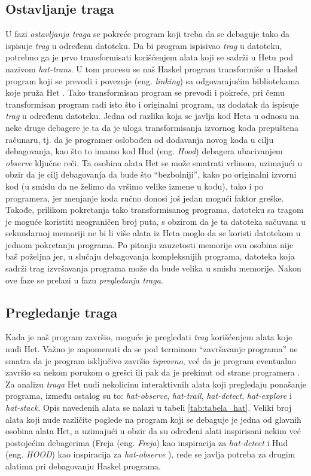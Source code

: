 \documentclass[a4paper]{article}
\begin{document}
{\subsection{Ostavljanje traga}
U fazi {\em ostavljanja traga} se pokreće program koji treba da se debaguje tako da ispisuje {\em trag} u određenu datoteku. Da bi program ispisivao {\em trag} u datoteku,
potrebno ga je prvo transformisati korišćenjem alata koji se sadrži u Hetu pod nazivom {\em hat-trans}. U tom procesu se naš Haskel program transformiše u
Haskel program koji se prevodi i povezuje (eng. {\em linking}) sa odgovarajućim bibliotekama koje pruža Het \cite{chitil2002transforming}. Tako transformisan program se prevodi i pokreće,
pri čemu transformisan program radi isto što i originalni program, uz dodatak da ispisuje {\em trag} u određenu datoteku. %
Jedna od razlika koja se javlja kod Heta u odnosu na neke druge debagere je ta da je uloga transformisanja izvornog koda prepuštena računaru, tj. da je programer oslobođen od dodavanja novog koda u cilju debagovanja, kao što to imamo kod Hud (eng. {\em Hood}) debagera ubacivanjem {\em observe} ključne reči.
Ta osobina alata Het se može smatrati vrlinom, uzimajući u obzir da je cilj debagovanja da bude što ``bezbolniji'', kako po originalni izvorni kod (u smislu da ne želimo da vršimo velike izmene u kodu), tako i po programera, jer menjanje koda ručno donosi još jedan mogući faktor greške. 
Takođe, prilikom pokretanja tako transformisanog programa, datoteku sa tragom je moguće koristiti neograničen broj puta, s obzirom da je ta datoteka sačuvana u sekundarnoj memoriji ne bi li više alata iz Heta moglo da se koristi datotekom u jednom pokretanju programa.
Po pitanju zauzetosti memorije ova osobina nije baš poželjna jer, u slučaju debagovanja kompleksnijih programa, datoteka koja sadrži trag izvršavanja programa može da bude velika u smislu memorije.
Nakon ove faze se prelazi u fazu {\em pregledanja traga}.

\subsection{Pregledanje traga}
Kada je naš program završio, moguće je pregledati {\em trag} korišćenjem alata koje nudi Het. Važno je napomenuti da se pod terminom ``završavanje programa'' ne smatra 
da je program isključivo završio {\em ispravno}, već da je program eventualno završio sa nekom porukom o grešci ili pak da je prekinut od strane programera \cite{hat_haskell_org}.
Za analizu {\em traga} Het nudi nekolicinu interaktivnih alata koji pregledaju ponašanje programa, 
između ostalog su to: {\em hat-observe}, {\em hat-trail}, {\em hat-detect}, {\em hat-explore} i {\em hat-stack}. Opis navedenih alata se nalazi u tabeli \ref{tab:tabela_hat}.
Veliki broj alata koji nude različite poglede na program koji se debaguje je jedna od glavnih osobina alata Het, a uzimajući u obzir da su određeni alati inspirisani nekim već postojećim debagerima (Freja (eng. {\em Freja}) kao inspiracija za {\em hat-detect} i Hud (eng. {\em HOOD}) kao inspiracija za {\em hat-observe} \cite{hat_haskell_org}), ređe se javlja potreba za drugim alatima pri debagovanju Haskel programa.

}
\end{document}
